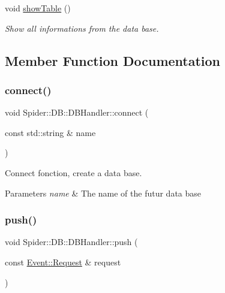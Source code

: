 \begin{DoxyCompactItemize}
\mbox{\label{class_spider_1_1_d_b_1_1_d_b_handler_a3068d47caf9cb45d72f3cd99530364f1}} 
void \hyperlink{class_spider_1_1_d_b_1_1_d_b_handler_a3068d47caf9cb45d72f3cd99530364f1}{show\+Table} ()
\begin{DoxyCompactList}\small\item\em Show all informations from the data base. \end{DoxyCompactList}\end{DoxyCompactItemize}


\subsection{Member Function Documentation}
\mbox{\label{class_spider_1_1_d_b_1_1_d_b_handler_a139355686a0f6eca4b58d26332c9a5c7}} 
\subsubsection{\texorpdfstring{connect()}{connect()}}
{\footnotesize\ttfamily void Spider\+::\+D\+B\+::\+D\+B\+Handler\+::connect (\begin{DoxyParamCaption}\item[{const std\+::string \&}]{name }\end{DoxyParamCaption})}



Connect fonction, create a data base. 


\begin{DoxyParams}{Parameters}
{\em name} & The name of the futur data base \\
\hline
\end{DoxyParams}
\mbox{\label{class_spider_1_1_d_b_1_1_d_b_handler_a12968ed2952aa4365d17733227bc4cdb}} 
\subsubsection{\texorpdfstring{push()}{push()}}
{\footnotesize\ttfamily void Spider\+::\+D\+B\+::\+D\+B\+Handler\+::push (\begin{DoxyParamCaption}\item[{const \hyperlink{class_spider_1_1_event_1_1_request}{Event\+::\+Request} \&}]{request }\end{DoxyParamCaption})}



